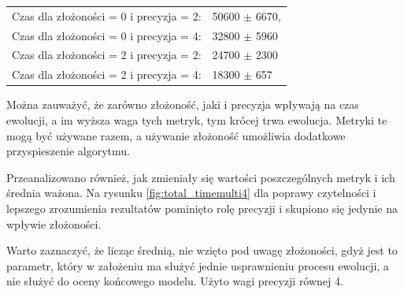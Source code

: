  \begin{center}
  \begin{tabular}{ll}
	Czas dla złożoności = 0 i precyzja = 2: & 50600 $\pm$ 6670, \\
	Czas dla złożoności = 0 i precyzja = 4: & 32800	$\pm$ 5960 \\
	Czas dla złożoności = 2 i precyzja = 2: & 24700 $\pm$ 2300 \\
	Czas dla złożoności = 2 i precyzja = 4: & 18300 $\pm$ 657 
  \end{tabular}
 \end{center}
 
Można zauważyć, że zarówno złożoność, jaki i precyzja wpływają na czas ewolucji, a im wyższa waga tych metryk, tym krócej trwa ewolucja. Metryki te mogą być używane razem, a używanie złożoność umożliwia dodatkowe przyspieszenie algorytmu.

Przeanalizowano również, jak zmieniały się wartości poszczególnych metryk i ich średnia ważona. Na rysunku \ref{fig:total_timemulti4} dla poprawy czytelności i lepszego zrozumienia rezultatów pominięto rolę precyzji i skupiono się jedynie na wpływie złożoności.

Warto zaznaczyć, że licząc średnią, nie wzięto pod uwagę złożoności, gdyż jest to parametr, który w założeniu ma służyć jednie usprawnieniu procesu ewolucji, a nie służyć do oceny końcowego modelu. Użyto wagi precyzji równej 4.

\begin{figure}[H]
\end{figure}


